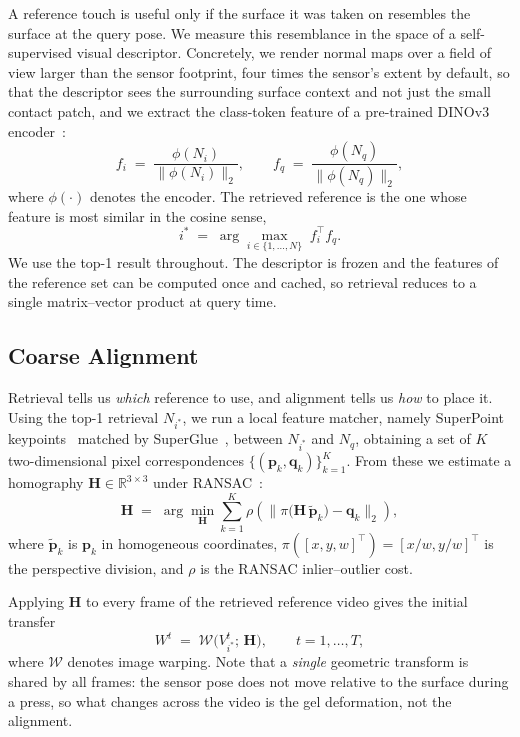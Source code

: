 A reference touch is useful only if the surface it was taken on resembles the surface at the
query pose. We measure this resemblance in the space of a self-supervised visual descriptor.
Concretely, we render normal maps over a field of view larger than the sensor footprint, four
times the sensor's extent by default, so that the descriptor sees the surrounding surface
context and not just the small contact patch, and we extract the class-token feature of a
pre-trained DINOv3 encoder~\cite{dinov3}:
\begin{equation}
  f_i \;=\; \frac{\phi(N_i)}{\lVert \phi(N_i) \rVert_2},
  \qquad
  f_q \;=\; \frac{\phi(N_q)}{\lVert \phi(N_q) \rVert_2},
\end{equation}
where $\phi(\cdot)$ denotes the encoder. The retrieved reference is the one whose feature is most
similar in the cosine sense,
\begin{equation}
  i^{*} \;=\; \arg\max_{i \in \{1,\dots,N\}} \; f_i^{\top} f_q .
  \label{eq:retrieval}
\end{equation}
We use the top-1 result throughout. The descriptor is frozen and the features of the reference set
can be computed once and cached, so retrieval reduces to a single matrix--vector product at query
time.

\subsection{Coarse Alignment}
\label{sec:coarse}

Retrieval tells us \emph{which} reference to use, and alignment tells us \emph{how} to place it.
Using the top-1 retrieval $N_{i^{*}}$, we run a local feature matcher, namely SuperPoint
keypoints~\cite{superpoint} matched by SuperGlue~\cite{superglue}, between $N_{i^{*}}$ and
$N_q$, obtaining a set of $K$ two-dimensional pixel correspondences
$\{(\mathbf{p}_k, \mathbf{q}_k)\}_{k=1}^{K}$. From these we estimate a homography
$\mathbf{H} \in \mathbb{R}^{3\times 3}$ under RANSAC~\cite{ransac}:
\begin{equation}
  \mathbf{H} \;=\; \arg\min_{\mathbf{H}} \sum_{k=1}^{K}
  \rho\!\left( \bigl\lVert \pi\bigl(\mathbf{H}\,\tilde{\mathbf{p}}_k\bigr) - \mathbf{q}_k
  \bigr\rVert_2 \right),
  \label{eq:homography}
\end{equation}
where $\tilde{\mathbf{p}}_k$ is $\mathbf{p}_k$ in homogeneous coordinates,
$\pi([x, y, w]^{\top}) = [x/w, y/w]^{\top}$ is the perspective division, and $\rho$ is the RANSAC
inlier--outlier cost.

Applying $\mathbf{H}$ to every frame of the retrieved reference video gives the initial transfer
\begin{equation}
  W^{t} \;=\; \mathcal{W}\bigl( V_{i^{*}}^{t}; \, \mathbf{H} \bigr),
  \qquad t = 1, \dots, T,
  \label{eq:warp}
\end{equation}
where $\mathcal{W}$ denotes image warping. Note that a \emph{single} geometric transform is shared
by all frames: the sensor pose does not move relative to the surface during a press, so what
changes across the video is the gel deformation, not the alignment.

